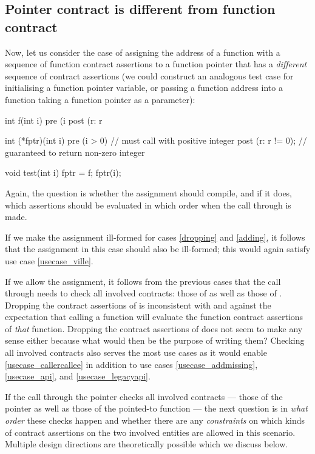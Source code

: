 
\subsection{Pointer contract is different from function contract}
\label{ptrfundifferent}

Now, let us consider the case of assigning the address of a function with a sequence of function contract assertions to a function pointer  that has a \emph{different} sequence of contract assertions (we could construct an analogous test case for initialising a function pointer variable, or passing a function address into a function taking a function pointer as a parameter):
\begin{codeblock}
int f(int i)
  pre (i %
  post (r: r %

int (*fptr)(int i)
  pre (i > 0)           // must call with positive integer
  post (r: r != 0);     // guaranteed to return non-zero integer

void test(int i) {
  fptr = f; 
  fptr(i);   
}
\end{codeblock}
Again, the question is whether the assignment should compile, and if it does, which assertions should be evaluated in which order when the call through  is made.

If we make the assignment ill-formed for cases \ref{dropping} and \ref{adding}, it follows that the assignment in this case should also be ill-formed; this would again satisfy use case \ref{usecase_ville}.

If we allow the assignment, it follows from the previous cases that the call through  needs to check all involved contracts: those of  as well as those of . Dropping the contract assertions of  is inconsistent with \cite{P2900R8} and against the expectation that calling a function will evaluate the function contract assertions of \emph{that} function. Dropping the contract assertions of  does not seem to make any sense either because what would then be the purpose of writing them? Checking all involved contracts also serves the most use cases as it would enable \ref{usecase_callercallee} in addition to use cases \ref{usecase_addmissing}, \ref{usecase_api}, and \ref{usecase_legacyapi}.

If the call through the pointer checks all involved contracts --- those of the pointer as well as those of the pointed-to function --- the next question is in \emph{what order} these checks happen and whether there are any \emph{constraints} on which kinds of contract assertions on the two involved entities are allowed in this scenario. Multiple design directions are theoretically possible which we discuss below.

